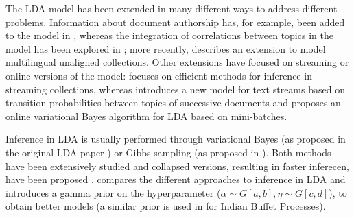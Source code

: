 
The LDA model \cite{blei_latent_2003} has been extended in many different ways to address different problems. Information about document authorship has, for example, been added to the model in \cite{Rosen_Zvi_2004}, whereas the integration of correlations between topics in the model has been explored in \cite{blei_correlated_2007}; more recently, \cite{Boyd_Graber_2009} describes an extension to model multilingual unaligned collections. Other extensions have focused on streaming or online versions of the model: \cite{Yao_2009} focuses on efficient methods for inference in streaming collections, whereas \cite{Wang_2012} introduces a new model for text streams based on transition probabilities between topics of successive documents and \cite{hoffman_online_2010} proposes an online variational Bayes algorithm for LDA based on mini-batches.

Inference in LDA is usually performed through variational Bayes (as proposed in the original LDA paper \cite{blei_latent_2003}) or Gibbs sampling (as proposed in \cite{griffiths04finding}). Both methods have been extensively studied and collapsed versions, resulting in faster inferecen, have been proposed \cite{teh_collapsed_2006,porteous_fast_2008}. \cite{porteous_fast_2008} compares the different approaches to inference in LDA and introduces a gamma prior on the hyperparameter ($\alpha \sim G[a,b], \eta \sim G[c,d]$), to obtain better models (a similar prior is used in \cite{Gorur_2006} for Indian Buffet Processes).

